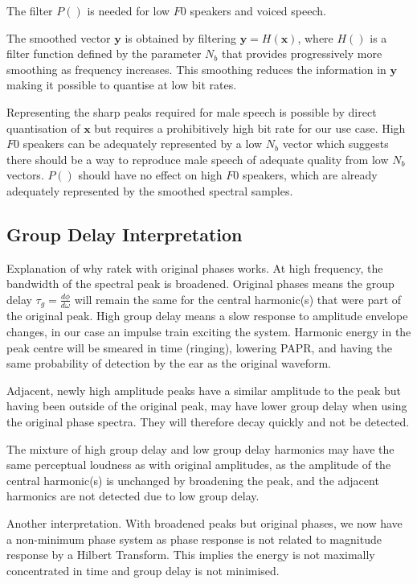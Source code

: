 \documentclass{article}
\begin{document}
The filter $P()$ is needed for low $F0$ speakers and voiced speech.

The smoothed vector $\mathbf{y}$ is obtained by filtering $\mathbf{y}=H(\mathbf{x})$, where $H()$ is a filter function defined by the parameter $N_b$ that provides progressively more smoothing as frequency increases.  This smoothing reduces the information in $\mathbf{y}$ making it possible to quantise at low bit rates.

Representing the sharp peaks required for male speech is possible by direct quantisation of $\mathbf{x}$ but requires a prohibitively high bit rate for our use case.  High $F0$ speakers can be adequately represented by a low $N_b$ vector  which suggests there should be a way to reproduce male speech of adequate quality from low $N_b$ vectors.  $P()$ should have no effect on high $F0$ speakers, which are already adequately represented by the smoothed spectral samples.

\subsection{Group Delay Interpretation}

Explanation of why ratek with original phases works.  At high frequency, the bandwidth of the spectral peak is broadened. Original phases means the group delay $\tau_g=\frac{d\phi}{d\omega}$ will remain the same for the central harmonic(s) that were part of the original peak.  High group delay means a slow response to amplitude envelope changes, in our case an impulse train exciting the system. Harmonic energy in the peak centre will be smeared in time (ringing), lowering PAPR, and having the same probability of detection by the ear as the original waveform.

Adjacent, newly high amplitude peaks have a similar amplitude to the peak but having been outside of the original peak, may have lower group delay when using the original phase spectra. They will therefore decay quickly and not be detected.

The mixture of high group delay and low group delay harmonics may have the same perceptual loudness as with original amplitudes, as the amplitude of the central harmonic(s) is unchanged by broadening the peak, and the adjacent harmonics are not detected due to low group delay.

Another interpretation.  With broadened peaks but original phases, we now have a non-minimum phase system as phase response is not related to magnitude response by a Hilbert Transform.  This implies the energy is not maximally concentrated in time and group delay is not minimised.
\end{document}
